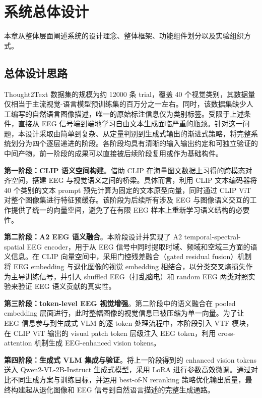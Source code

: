 \section{系统总体设计}

本章从整体层面阐述系统的设计理念、整体框架、功能组件划分以及实验组织方式。

\subsection{总体设计思路}

Thought2Text 数据集的规模为约 12000 条 trial，覆盖 40 个视觉类别，其数据量仅相当于主流视觉-语言模型预训练集的百万分之一左右。同时，该数据集缺少人工编写的自然语言图像描述，唯一的原始标注信息仅为类别标签。受限于上述条件，直接从 EEG 信号端到端地学习自由文本生成面临严重的瓶颈。针对这一问题，本设计采取由简单到复杂、从定量判别到生成式输出的渐进式策略，将完整系统划分为四个逐层递进的阶段。各阶段均具有清晰的输入输出约定和可独立验证的中间产物，前一阶段的成果可以直接被后续阶段复用或作为基础构件。

\textbf{第一阶段：CLIP 语义空间构建}。借助 CLIP 在海量图文数据上习得的跨模态对齐空间，搭建 EEG 与视觉语义之间的桥梁。具体而言，利用 CLIP 文本编码器将 40 个类别的文本 prompt 预先计算为固定的文本原型向量，同时通过 CLIP ViT 对整个图像集进行特征预缓存。该阶段为后续所有涉及 EEG 与图像语义交互的工作提供了统一的向量空间，避免了在有限 EEG 样本上重新学习语义结构的必要性。

\textbf{第二阶段：A2 EEG 语义融合}。本阶段设计并实现了 A2 temporal-spectral-spatial EEG encoder，用于从 EEG 信号中同时提取时域、频域和空域三方面的语义信息。在 CLIP 向量空间中，采用门控残差融合（gated residual fusion）机制将 EEG embedding 与退化图像的视觉 embedding 相结合，以分类交叉熵损失作为主导训练信号，并引入 shuffled EEG（打乱脑电）和 random EEG 两类对照实验来验证 EEG 语义贡献的真实性。

\textbf{第三阶段：token-level EEG 视觉增强}。第二阶段中的语义融合在 pooled embedding 层面进行，此时整幅图像的视觉信息已被压缩为单一向量。为了让 EEG 信息参与到生成式 VLM 的逐 token 处理流程中，本阶段引入 VTF 模块，在 CLIP ViT 输出的 visual patch token 层级注入 EEG token，利用 cross-attention 机制生成 EEG-enhanced vision tokens。

\textbf{第四阶段：生成式 VLM 集成与验证}。将上一阶段得到的 enhanced vision tokens 送入 Qwen2-VL-2B-Instruct 生成式模型，采用 LoRA 进行参数高效微调。通过对比不同生成方案与训练目标，并运用 best-of-N reranking 策略优化输出质量，最终构建起从退化图像和 EEG 信号到自然语言描述的完整生成通路。

